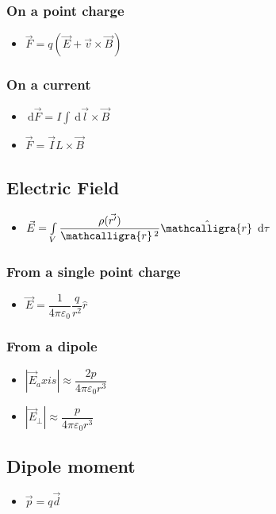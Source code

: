 \documentclass[]{report}
\newcommand \tab[1][1cm]{\hspace*{#1}}
\newcommand{\dn}[1]{\ \mathrm{d}#1}
\newcommand{\itemt}{\item \tab}
\newcommand{\scriptr}{\mathcalligra{r}\,}
\begin{document}
\subsubsection{On a point charge}
\begin{itemize}
\itemt \( \vec{F} = q(\vec{E}+\vec{v}\times \vec{B})\)
\end{itemize}

\subsubsection{On a current}
\begin{itemize}
\itemt \( \dn\vec{F} = I \int \dn\vec{l} \times \vec{B} \)
\itemt \( \vec{F} = \vec{I}L\times \vec{B} \)
\end{itemize}

		\subsection{Electric Field}
        
\begin{itemize}
\itemt \( \vec{E} = \int\limits_V \dfrac{\rho(\vec{r'})}{\scriptr ^2}\hat{\scriptr} \dn\tau \)
\end{itemize}

\subsubsection{From a single point charge}
\begin{itemize}
\itemt \( \vec{E} = \dfrac{1}{4\pi\varepsilon_0} \dfrac{q}{r^2} \hat{r} \)
\end{itemize}

\subsubsection{From a dipole}
\begin{itemize}
\itemt \( |\vec{E}_axis| \approx \dfrac{2p}{4\pi\varepsilon_0r^3} \)
\itemt \( |\vec{E}_\perp| \approx \dfrac{p}{4\pi\varepsilon_0r^3} \)
\end{itemize}

		\subsection{Dipole moment}
        
\begin{itemize}
\itemt \( \vec{p} = q\vec{d} \)
\end{itemize}
\end{document}
